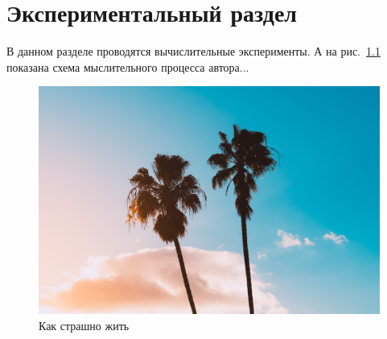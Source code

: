 \chapter{Экспериментальный раздел}
\label{cha:research}

В данном разделе проводятся вычислительные эксперименты.
А на рис.~\ref{fig:spire01} показана схема мыслительного процесса автора...

\begin{figure}
    \centering
    \includegraphics[width=\textwidth]{figures/pic01}
    \caption{Как страшно жить}
    \label{fig:spire01}
\end{figure}


